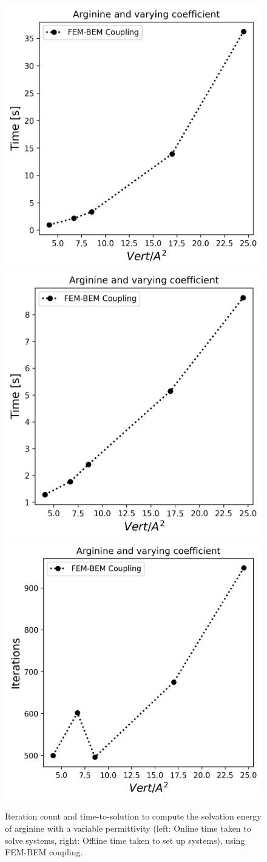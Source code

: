 \begin{figure}
\centering
\includegraphics[width=0.45\linewidth]{DolfinX_Arginine2_varying_coeff_time.png}
\includegraphics[width=0.45\linewidth]{DolfinX_Arginine2_varying_coeff_set_time.png}
\includegraphics[width=0.45\linewidth]{DolfinX_Arginine2_varying_coeff_iter.png}
\caption{Iteration count and time-to-solution to compute the solvation energy of arginine with a variable permittivity (left: Online time taken to solve systems, right: Offline time taken to set up systems), using FEM-BEM coupling. %
}
\label{fig:arg2_variable}
\end{figure}


